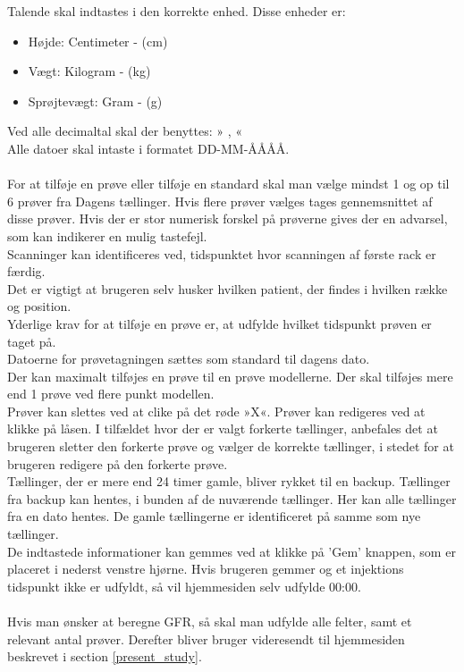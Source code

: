 \documentclass{article}
\begin{document}
Talende skal indtastes i den korrekte enhed. Disse enheder er:
\begin{itemize}
	\item Højde: Centimeter - (cm)
	\item Vægt: Kilogram - (kg)
	\item Sprøjtevægt: Gram - (g)
\end{itemize}
Ved alle decimaltal skal der benyttes: » , «\\%
Alle datoer skal intaste i formatet DD-MM-ÅÅÅÅ.\\\\
For at tilføje en prøve eller tilføje en standard skal man vælge mindst 1 og op til 6 prøver fra Dagens tællinger. Hvis flere prøver vælges tages gennemsnittet af disse prøver. Hvis der er stor numerisk forskel på prøverne gives der en advarsel, som kan indikerer en mulig tastefejl.\\
Scanninger kan identificeres ved, tidspunktet hvor scanningen af første rack er færdig.\\

Det er vigtigt at brugeren selv husker hvilken patient, der findes i hvilken række og position.\\

Yderlige krav for at tilføje en prøve er, at udfylde hvilket tidspunkt prøven er taget på.\\ Datoerne for prøvetagningen sættes som standard til dagens dato.\\
Der kan maximalt tilføjes en prøve til en prøve modellerne. Der skal tilføjes mere end 1 prøve ved flere punkt modellen.\\

Prøver kan slettes ved at clike på det røde »X«. Prøver kan redigeres ved at klikke på låsen. I tilfældet hvor der er valgt forkerte tællinger, anbefales det at brugeren sletter den forkerte prøve og vælger de korrekte tællinger, i stedet for at brugeren redigere på den forkerte prøve.\\

Tællinger, der er mere end 24 timer gamle, bliver rykket til en backup. Tællinger fra backup kan hentes, i bunden af de nuværende tællinger. Her kan alle tællinger fra en dato hentes. De gamle tællingerne er identificeret på samme som nye tællinger.
\\

De indtastede informationer kan gemmes ved at klikke på 'Gem' knappen, som er placeret i nederst venstre hjørne. Hvis brugeren gemmer og et injektions tidspunkt ikke er udfyldt, så vil hjemmesiden selv udfylde 00:00.\\\\
Hvis man ønsker at beregne GFR, så skal man udfylde alle felter, samt et relevant antal prøver. Derefter bliver bruger videresendt til hjemmesiden beskrevet i section \ref{present_study}.\\
\end{document}
